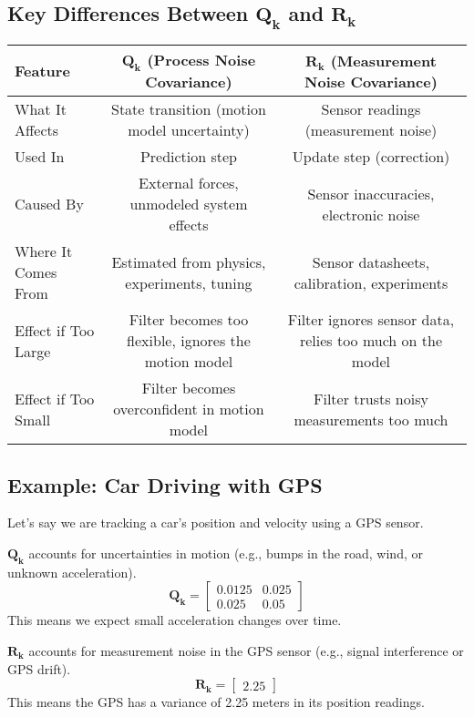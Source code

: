 \documentclass{article}
\begin{document}
\subsection*{Key Differences Between \(\mathbf{Q_k}\) and \(\mathbf{R_k}\)}

\begin{table}[h]
    \centering
    \renewcommand{\arraystretch}{1.3}
    \begin{tabular}{@{}lcc@{}}
        \toprule
        \textbf{Feature} & \(\mathbf{Q_k}\) (Process Noise Covariance) & \(\mathbf{R_k}\) (Measurement Noise Covariance) \\
        \midrule
        What It Affects & State transition (motion model uncertainty) & Sensor readings (measurement noise) \\
        Used In & Prediction step & Update step (correction) \\
        Caused By & External forces, unmodeled system effects & Sensor inaccuracies, electronic noise \\
        Where It Comes From & Estimated from physics, experiments, tuning & Sensor datasheets, calibration, experiments \\
        Effect if Too Large & Filter becomes too flexible, ignores the motion model & Filter ignores sensor data, relies too much on the model \\
        Effect if Too Small & Filter becomes overconfident in motion model & Filter trusts noisy measurements too much \\
        \bottomrule
    \end{tabular}
\end{table}

\subsection*{Example: Car Driving with GPS}

Let’s say we are tracking a car’s position and velocity using a GPS sensor.

\(\mathbf{Q_k}\) accounts for uncertainties in motion (e.g., bumps in the road, wind, or unknown acceleration).
\[
\mathbf{Q_k} =
\begin{bmatrix}
0.0125 & 0.025 \\
0.025  & 0.05
\end{bmatrix}
\]
This means we expect small acceleration changes over time.

\(\mathbf{R_k}\) accounts for measurement noise in the GPS sensor (e.g., signal interference or GPS drift).
\[
\mathbf{R_k} =
\begin{bmatrix}
2.25
\end{bmatrix}
\]
This means the GPS has a variance of 2.25 meters in its position readings.
\end{document}
